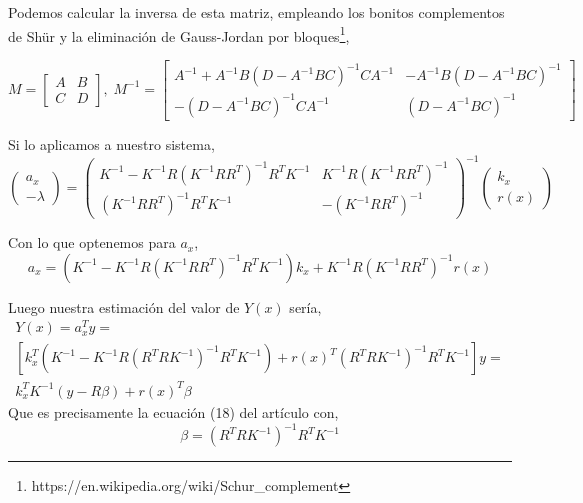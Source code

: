 \documentclass[10pt,a4paper]{report}
\begin{document}
Podemos calcular la inversa de esta matriz, empleando los bonitos complementos de Shür y la eliminación de Gauss-Jordan por bloques\footnote{
https://en.wikipedia.org/wiki/Schur\_complement},

\begin{equation*}
M = \begin{bmatrix}
A & B\\
C & D
\end{bmatrix},\; M^{-1} = \begin{bmatrix}
A^{-1}+A^{-1}B(D-A^{-1}BC)^{-1}CA^{-1} & -A^{-1}B(D-A^{-1}BC)^{-1}\\
-(D-A^{-1}BC)^{-1}CA^{-1} & (D-A^{-1}BC)^{-1}
\end{bmatrix}
\end{equation*}

Si lo aplicamos a nuestro sistema,
\begin{equation}
 \begin{pmatrix}
a_x \\ -\lambda
\end{pmatrix}= \begin{pmatrix}
K^{-1}-K^{-1}R(K^{-1}RR^T)^{-1}R^TK^{-1} & K^{-1}R(K^{-1}RR^T)^{-1}\\
(K^{-1}RR^T)^{-1}R^TK^{-1} & -(K^{-1}RR^T)^{-1}
\end{pmatrix}^{-1}\begin{pmatrix} k_x \\ r(x)
\end{pmatrix}
\end{equation}

Con lo que optenemos para $a_x$,
\begin{equation}
a_x = (K^{-1}-K^{-1}R(K^{-1}RR^T)^{-1}R^TK^{-1})k_x +  K^{-1}R(K^{-1}RR^T)^{-1}r(x)
\end{equation}

Luego nuestra estimación del valor de $Y(x)$ sería,
\begin{equation}
\begin{split}
Y(x) = a_x^Ty =\\
\left[k_x^T(K^{-1}-K^{-1}R(R^TRK^{-1})^{-1}R^TK^{-1})+r(x)^T(R^TRK^{-1})^{-1}R^TK^{-1}\right]y=\\
k_x^TK^{-1}(y-R\beta)+r(x)^T\beta
\end{split}
\end{equation}
Que es precisamente la ecuación (18) del artículo con,
\begin{equation}
\beta = (R^TRK^{-1})^{-1}R^TK^{-1}
\end{equation}
\end{document}
